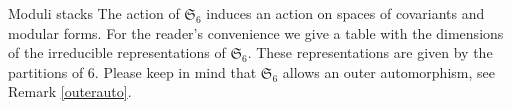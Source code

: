 \documentclass[12pt]{amsart}
\numberwithin{equation}{section}
\numberwithin{equation}{section}
\theoremstyle{definition}
\theoremstyle{remark}
\begin{document}
\begin{section}{Moduli stacks}
The action of $\mathfrak{S}_6$ induces an action on spaces of covariants and modular forms.
For the reader's convenience we give a table with the dimensions of the irreducible representations of
$\mathfrak{S}_6$. These representations are given by the partitions of $6$. Please keep in mind
 that $\mathfrak{S}_6$ allows an outer automorphism, see Remark \ref{outerauto}.



\end{section}
\end{document}
